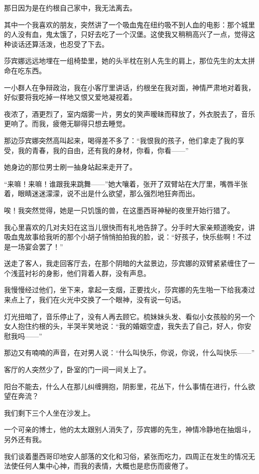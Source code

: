 \par 那日因为是在约根自己家中，我无法离去。
\par 其中一个我喜欢的朋友，突然讲了一个吸血鬼在纽约吸不到人血的电影：那个城里的人没有血，鬼太饿了，只好去吃了一个汉堡。这使我又稍稍高兴了一点，觉得这种谈话还算活泼，也忍受了下去。
\par 莎宾娜远远地埋在一组椅垫里，她的头半枕在别人先生的肩上，那位先生的太太拼命在吃东西。
\par 一小群人在争辩政治，我在小客厅里讲话，约根坐在我对面，神情严肃地对着我，好似要将我吃掉一样地又恨又爱地凝视着。
\par 夜浓了，酒更烈了，室内烟雾一片，男女的笑声暧昧而释放了，外衣脱去了，音乐更响了。而我，疲倦无聊得只想去睡觉。
\par 那边莎宾娜突然高叫起来，喝得差不多了：“我恨我的孩子，他们拿走了我的享受，我的青春，我的自由，还有我的身材，你看，你看——”
\par 她身边的那位男士刷一抽身站起来走开了。
\par “来嘛！来嘛！谁跟我来跳舞——”她大嚷着，张开了双臂站在大厅里，嘴唇半张着，眼睛迷迷濛濛，说不出是什么欲望，那么强烈地狂奔而出。
\par 唉！我突然觉得，她是一只饥饿的兽，在这墨西哥神秘的夜里开始行猎了。
\par 我心里喜欢的几对夫妇在这当儿很快而有礼地告辞了。分手时大家亲颊道晚安，讲吸血鬼故事给我听的那个小胡子悄悄拍拍我的脸，说：“好孩子，快乐些啊！不过是一场宴会罢了！”
\par 送走了客人，我走回客厅去，在那个阴暗的大盆景边，莎宾娜的双臂紧紧缠住了一个浅蓝衬衫的身影，他们背着人群，没有声息。
\par 我慢慢经过他们，坐下来，拿起一支烟，正要找火，莎宾娜的先生啪一下给我凑过来点上了，我们在火光中交换了一个眼神，没有说一句话。
\par 灯光扭暗了，音乐停止了，没有人再去顾它。梳妹妹头发、看似小女孩般的另一个女人抱住约根的头，半哭半笑地说：“我的婚姻空虚，我失去了自己，好人，你安慰我吗——”
\par 那边又有喃喃的声音，在对男人说：“什么叫快乐，你说，你说，什么叫快乐——”
\par 客厅的人突然少了，卧室的门一间一间关上了。
\par 阳台不能去，什么人在那儿纠缠拥抱，阴影里，花丛下，什么事情在进行，什么欲望在奔流？
\par 我们剩下三个人坐在沙发上。
\par 一个可亲的博士，他的太太跟别人消失了，莎宾娜的先生，神情冷静地在抽烟斗，另外还有我。
\par 我们谈着墨西哥印地安人部落的文化和习俗，紧张而吃力，四周正在发生的情况无法使任何人集中心神，而我的表情，大概也是悲伤而疲倦了。
